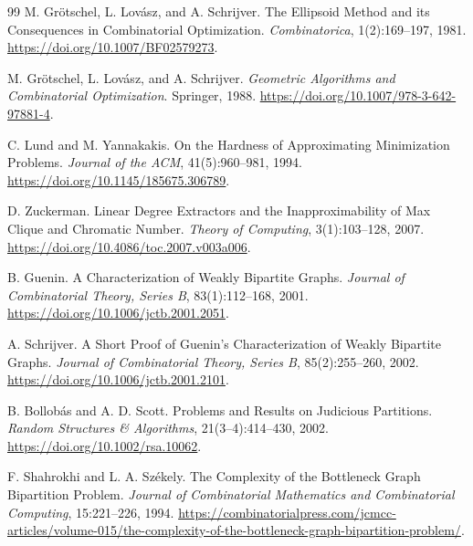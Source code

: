 \documentclass[11pt,a4paper]{ctexart}
\theoremstyle{definition}
\newcommand{\1}{\boldsymbol 1}
\newcommand{\0}{\boldsymbol 0}
\begin{document}
\begin{thebibliography}{99}
M. Gr\"otschel, L. Lov\'asz, and A. Schrijver.
\newblock The Ellipsoid Method and its Consequences in Combinatorial Optimization.
\newblock \emph{Combinatorica}, 1(2):169--197, 1981.
\newblock \url{https://doi.org/10.1007/BF02579273}.

M. Gr\"otschel, L. Lov\'asz, and A. Schrijver.
\newblock \emph{Geometric Algorithms and Combinatorial Optimization}.
\newblock Springer, 1988.
\newblock \url{https://doi.org/10.1007/978-3-642-97881-4}.

C. Lund and M. Yannakakis.
\newblock On the Hardness of Approximating Minimization Problems.
\newblock \emph{Journal of the ACM}, 41(5):960--981, 1994.
\newblock \url{https://doi.org/10.1145/185675.306789}.

D. Zuckerman.
\newblock Linear Degree Extractors and the Inapproximability of Max Clique and Chromatic Number.
\newblock \emph{Theory of Computing}, 3(1):103--128, 2007.
\newblock \url{https://doi.org/10.4086/toc.2007.v003a006}.

B. Guenin.
\newblock A Characterization of Weakly Bipartite Graphs.
\newblock \emph{Journal of Combinatorial Theory, Series B}, 83(1):112--168, 2001.
\newblock \url{https://doi.org/10.1006/jctb.2001.2051}.

A. Schrijver.
\newblock A Short Proof of Guenin's Characterization of Weakly Bipartite Graphs.
\newblock \emph{Journal of Combinatorial Theory, Series B}, 85(2):255--260, 2002.
\newblock \url{https://doi.org/10.1006/jctb.2001.2101}.

B. Bollob\'as and A. D. Scott.
\newblock Problems and Results on Judicious Partitions.
\newblock \emph{Random Structures \& Algorithms}, 21(3--4):414--430, 2002.
\newblock \url{https://doi.org/10.1002/rsa.10062}.

F. Shahrokhi and L. A. Sz\'ekely.
\newblock The Complexity of the Bottleneck Graph Bipartition Problem.
\newblock \emph{Journal of Combinatorial Mathematics and Combinatorial Computing}, 15:221--226, 1994.
\newblock \url{https://combinatorialpress.com/jcmcc-articles/volume-015/the-complexity-of-the-bottleneck-graph-bipartition-problem/}.
\end{thebibliography}
\end{document}
